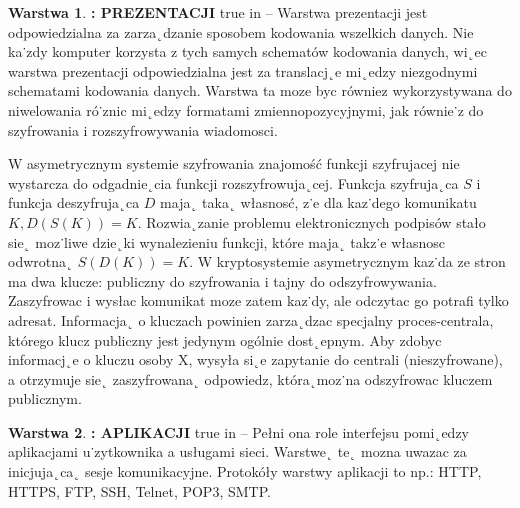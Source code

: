 \documentclass[a4paper,11pt]{article}
\theoremstyle{definition}
\newtheorem{tw}{Warstwa}
\begin{document}
\begin{tw}\textbf{: PREZENTACJI}
	 true in 
	-- Warstwa prezentacji jest odpowiedzialna za zarza˛dzanie sposobem
	kodowania wszelkich danych. Nie ka˙zdy komputer korzysta z tych samych schematów
	kodowania danych, wi˛ec warstwa prezentacji odpowiedzialna jest za translacj˛e mi˛edzy niezgodnymi
	schematami kodowania danych. Warstwa ta moze byc równiez wykorzystywana
	do niwelowania ró˙znic mi˛edzy formatami zmiennopozycyjnymi, jak równie˙z do szyfrowania
	i rozszyfrowywania wiadomosci.\medskip
	
	\noindent \hspace{0.9cm} 
	W asymetrycznym systemie szyfrowania znajomość funkcji szyfrujacej nie wystarcza do
	odgadnie˛cia funkcji rozszyfrowuja˛cej. Funkcja szyfruja˛ca $S$ i funkcja deszyfruja˛ca $D$ maja˛
	taka˛ własnosć, z˙e dla kaz˙dego komunikatu $K, D(S(K)) = K$. Rozwia˛zanie problemu
	elektronicznych podpisów stało sie˛ moz˙liwe dzie˛ki wynalezieniu funkcji, które maja˛ takz˙e
	własnosc odwrotna˛ $S(D(K)) = K$. W kryptosystemie asymetrycznym kaz˙da ze stron ma
	dwa klucze: publiczny do szyfrowania i tajny do odszyfrowywania. Zaszyfrowac i wysłac
	komunikat moze zatem kaz˙dy, ale odczytac go potrafi tylko adresat. Informacja˛ o kluczach
	powinien zarza˛dzac specjalny proces-centrala, którego klucz publiczny jest jedynym ogólnie
	dost˛epnym. Aby zdobyc informacj˛e o kluczu osoby X, wysyła si˛e zapytanie do centrali
	(nieszyfrowane), a otrzymuje sie˛ zaszyfrowana˛ odpowiedz, która˛moz˙na odszyfrowac kluczem
	publicznym.
\end{tw}
\begin{tw}\textbf{: APLIKACJI}
	 true in 
	-- Pełni ona role interfejsu pomi˛edzy aplikacjami u˙zytkownika a usługami	sieci. Warstwe˛ te˛ mozna uwazac za inicjuja˛ca˛ sesje komunikacyjne. Protokóły warstwy
	aplikacji to np.: HTTP, HTTPS, FTP, SSH, Telnet, POP3, SMTP.
\end{tw}
\end{document}
